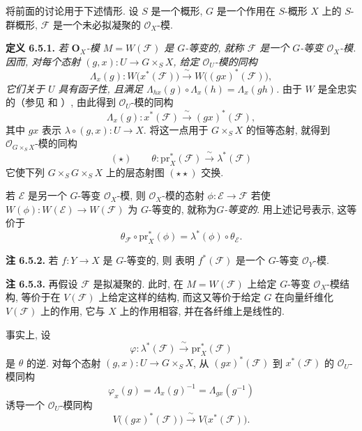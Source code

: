 将前面的讨论用于下述情形. 设 \(S\) 是一个概形,
\(G\) 是一个作用在 \(S\)-概形 \(X\) 上的 \(S\)-群概形,
\(\mathcal F\) 是一个未必拟凝聚的 \(\mathcal O_X\)-模.

\medskip
\noindent{}\textbf{定义 6.5.1.}
\textit{若 \(\mathbf O_X\)-模 \(M=W(\mathcal F)\) 是
\(G\)-等变的, 就称 \(\mathcal F\) 是一个 \(G\)-等变
\(\mathcal O_X\)-模. 因而, 对每个态射
\((g,x):U\to G\times_S X\), 给定 \(\mathcal O_U\)-模的同构}
\[
  \Lambda_x(g):
  W\bigl(x^*(\mathcal F)\bigr)
  \xrightarrow{\ \sim\ }
  W\bigl((gx)^*(\mathcal F)\bigr),
\]
\textit{它们关于 \(U\) 具有函子性, 且满足
\(\Lambda_{hx}(g)\circ\Lambda_x(h)=\Lambda_x(gh)\).}
由于 \(W\) 是全忠实的（参见 
和 ）, 由此得到
\(\mathcal O_U\)-模的同构
\[
  \Lambda_x(g):x^*(\mathcal F)
  \xrightarrow{\ \sim\ }(gx)^*(\mathcal F),
\]
其中 \(gx\) 表示 \(\lambda\circ(g,x):U\to X\).
将这一点用于 \(G\times_S X\) 的恒等态射, 就得到
\(\mathcal O_{G\times_S X}\)-模的同构
\[
  (\star)\qquad
  \theta:\mathrm{pr}_X^*(\mathcal F)
  \xrightarrow{\ \sim\ }\lambda^*(\mathcal F)
\]
它使下列 \(G\times_SG\times_SX\) 上的层态射图 \((\star\star)\) 交换.

\begin{figure}[H]
  \centering
  
  \label{fig:sga3-exp1-p043-sheaf-cocycle}
\end{figure}

若 \(\mathcal E\) 是另一个 \(G\)-等变 \(\mathcal O_X\)-模,
则 \(\mathcal O_X\)-模的态射 \(\phi:\mathcal E\to\mathcal F\)
若使 \(W(\phi):W(\mathcal E)\to W(\mathcal F)\) 为 \(G\)-等变的,
就称为\emph{\(G\)-等变的}. 用上述记号表示, 这等价于
\[
  \theta_{\mathcal F}\circ\mathrm{pr}_X^*(\phi)
  =\lambda^*(\phi)\circ\theta_{\mathcal E}.
\]

\medskip
\noindent{}\textbf{注 6.5.2.}
若 \(f:Y\to X\) 是 \(G\)-等变的, 则
表明 \(f^*(\mathcal F)\) 是一个 \(G\)-等变
\(\mathcal O_Y\)-模.

\medskip
\noindent{}\textbf{注 6.5.3.}
再假设 \(\mathcal F\) 是拟凝聚的. 此时, 在
\(M=W(\mathcal F)\) 上给定 \(G\)-等变 \(\mathcal O_X\)-模结构,
等价于在 \(V(\mathcal F)\) 上给定这样的结构, 而这又等价于给定
\(G\) 在向量纤维化 \(V(\mathcal F)\) 上的作用, 它与 \(X\) 上的作用相容,
并在各纤维上是线性的.

事实上, 设
\[
  \varphi:\lambda^*(\mathcal F)
  \xrightarrow{\ \sim\ }\mathrm{pr}_X^*(\mathcal F)
\]
是 \(\theta\) 的逆. 对每个态射
\((g,x):U\to G\times_S X\), 从 \((gx)^*(\mathcal F)\) 到
\(x^*(\mathcal F)\) 的 \(\mathcal O_U\)-模同构
\[
  \varphi_x(g)
  =\Lambda_x(g)^{-1}
  =\Lambda_{gx}(g^{-1})
\]
诱导一个 \(\mathcal O_U\)-模同构
\[
  V\bigl((gx)^*(\mathcal F)\bigr)
  \xrightarrow{\ \sim\ }V\bigl(x^*(\mathcal F)\bigr).
\]

